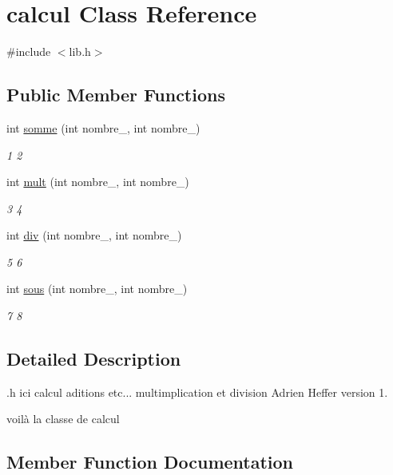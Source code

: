 \hypertarget{classcalcul}{}\section{calcul Class Reference}
\label{classcalcul}


{\ttfamily \#include $<$lib.\+h$>$}

\subsection*{Public Member Functions}
\begin{DoxyCompactItemize}
\item 
int \hyperlink{classcalcul_a40f51a847c5ac1001051a9631e5e1e08}{somme} (int nombre\+\_, int nombre\+\_)
\begin{DoxyCompactList}\small\item\em 1  2 \end{DoxyCompactList}\item 
int \hyperlink{classcalcul_abcd7959addf8dbb37033863a08427c35}{mult} (int nombre\+\_, int nombre\+\_)
\begin{DoxyCompactList}\small\item\em 3  4 \end{DoxyCompactList}\item 
int \hyperlink{classcalcul_aa01e3cde33261aac6fa771fd81675950}{div} (int nombre\+\_, int nombre\+\_)
\begin{DoxyCompactList}\small\item\em 5  6 \end{DoxyCompactList}\item 
int \hyperlink{classcalcul_ad5891d57df21f31e4452ca175b1df055}{sous} (int nombre\+\_, int nombre\+\_)
\begin{DoxyCompactList}\small\item\em 7  8 \end{DoxyCompactList}\end{DoxyCompactItemize}


\subsection{Detailed Description}
.h ici calcul aditions etc... multimplication et division Adrien Heffer version 1.

voilà la classe de calcul 

\subsection{Member Function Documentation}
\mbox{\label{classcalcul_aa01e3cde33261aac6fa771fd81675950}} 
